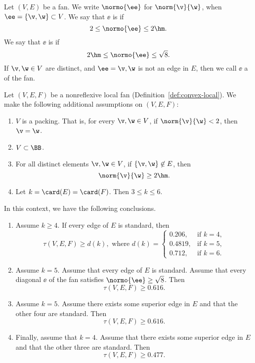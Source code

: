 \begin{definition} Let $(V,E)$ be a fan.  
We write $\normo{\ee}$ for $\norm{\v}{\w}$, when $\ee=\{\v,\w\}\subset V$.
We say that  $\ee$ is  if
\[
2\le \normo{\ee}\le2\hm.
\]
We say that  $\ee$ is  if
\[
2\hm\le \normo{\ee}\le\sqrt{8}.
\]
If $\v,\w\in V$ are distinct, and $\ee={\v,\w}$ is not an edge in $E$, then
we call $\ee$ a  of the fan.
\end{definition}


\begin{theorem}\label{lemma:empty-d}
Let $(V,E,F)$ be a nonreflexive local fan (Definition~\ref{def:convex-local}).
We make the following additional
assumptions on $(V,E,F)$:
\begin{enumerate}
\item {} $V$ is a packing.  That is, for every $\v,\w\in
V$, if $\norm{\v}{\w}<2$, then $\v=\w$.
\item {} $V\subset \BB$.
\item {} For all distinct elements $\v,\w\in V$, if
$\{\v,\w\}\not\in E$, then 
\[ 
\norm{\v}{\w}\ge 2\hm.
\] 
\item {} 
Let   $k=\card(E)=\card(F)$.  Then $3\le k \le 6$.
\end{enumerate}
In this context, we have the following conclusions.
\begin{enumerate}
\item Assume $k\ge 4$.  If  every edge of $E$ is standard, then
\[ 
\tau(V,E,F) \ge d (k), \text{ where } d(k) =
\begin{cases}
  0.206,&\text{if }k=4,\\
  0.4819,&\text{if }k=5,\\
  0.712,&\text{if }k=6.
\end{cases}
\] 
\item Assume $k=5$.  Assume that every edge of $E$ is standard.
Assume that every diagonal $\ee$ of the fan satisfies $\normo{\ee}\ge\sqrt{8}$.
Then 
\[
\tau(V,E,F)\ge 0.616.
\]
\item Assume $k=5$.  Assume there exists some superior edge in $E$ 
and that the other four are standard.  Then 
\[
\tau(V,E,F)\ge 0.616.
\]
\item Finally, assume that $k=4$.  Assume that there exists some superior
 edge in $E$ and that the other three are standard.  Then
\[
\tau(V,E,F)\ge 0.477.
\]
\end{enumerate}
\end{theorem}

